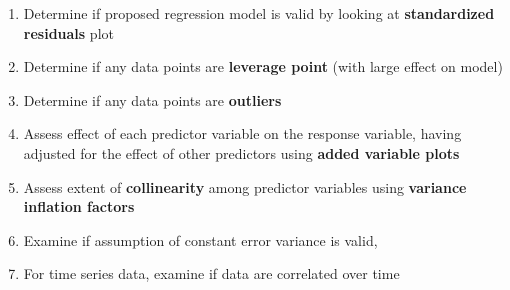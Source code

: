\documentclass[11pt]{article}
\begin{document}
    
\begin{enumerate}
    \item Determine if proposed regression model is valid by looking at \textbf{standardized residuals} plot 
    \item Determine if any data points are \textbf{leverage point} (with large effect on model) 
    \item Determine if any data points are \textbf{outliers}
    \item Assess effect of each predictor variable on the response variable, having adjusted for the effect of other predictors using \textbf{added variable plots}
    \item Assess extent of \textbf{collinearity} among predictor variables using \textbf{variance inflation factors}
    \item Examine if assumption of constant error variance is valid, 
    \item For time series data, examine if data are correlated over time
\end{enumerate}
\end{document}
